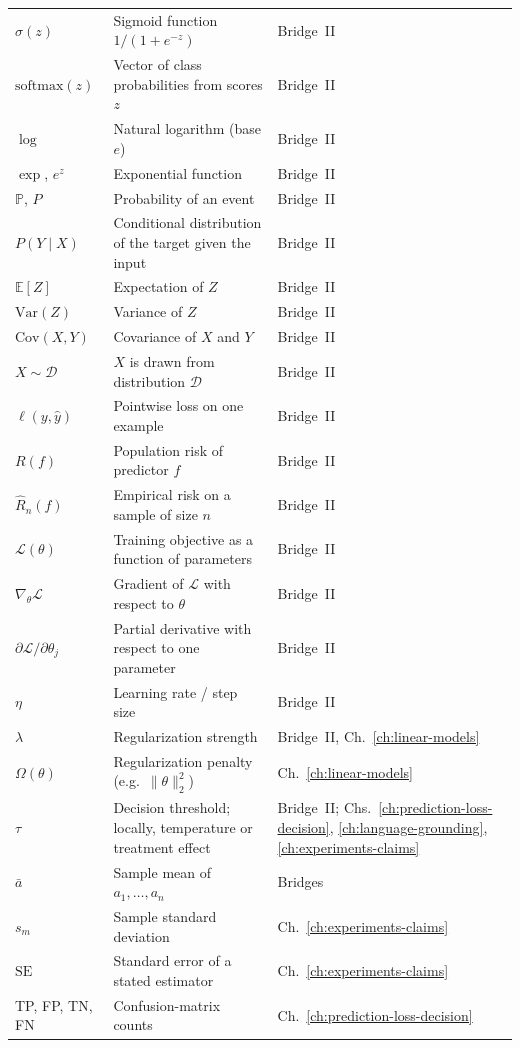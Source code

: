 \begin{longtable}{@{}L{2.0cm}L{5.55cm}L{2.6cm}@{}}
$\sigma(z)$ & Sigmoid function $1/(1+e^{-z})$ & Bridge~II \\
$\mathrm{softmax}(z)$ & Vector of class probabilities from scores $z$ & Bridge~II \\
$\log$ & Natural logarithm (base $e$) & Bridge~II \\
$\exp$, $e^z$ & Exponential function & Bridge~II \\
$\mathbb{P}$, $P$ & Probability of an event & Bridge~II \\
$P(Y \mid X)$ & Conditional distribution of the target given the input & Bridge~II \\
$\mathbb{E}[Z]$ & Expectation of $Z$ & Bridge~II \\
$\mathrm{Var}(Z)$ & Variance of $Z$ & Bridge~II \\
$\mathrm{Cov}(X,Y)$ & Covariance of $X$ and $Y$ & Bridge~II \\
$X \sim \mathcal{D}$ & $X$ is drawn from distribution $\mathcal{D}$ & Bridge~II \\
$\ell(y,\hat{y})$ & Pointwise loss on one example & Bridge~II \\
$R(f)$ & Population risk of predictor $f$ & Bridge~II \\
$\hat{R}_n(f)$ & Empirical risk on a sample of size $n$ & Bridge~II \\
$\mathcal{L}(\theta)$ & Training objective as a function of parameters & Bridge~II \\
$\nabla_\theta \mathcal{L}$ & Gradient of $\mathcal{L}$ with respect to $\theta$ & Bridge~II \\
$\partial \mathcal{L}/\partial \theta_j$ & Partial derivative with respect to one parameter & Bridge~II \\
$\eta$ & Learning rate / step size & Bridge~II \\
$\lambda$ & Regularization strength & Bridge~II, Ch.~\ref{ch:linear-models} \\
$\Omega(\theta)$ & Regularization penalty (e.g.\ $\|\theta\|_2^2$) & Ch.~\ref{ch:linear-models} \\
$\tau$ & Decision threshold; locally, temperature or treatment effect & Bridge~II; Chs.~\ref{ch:prediction-loss-decision}, \ref{ch:language-grounding}, \ref{ch:experiments-claims} \\
$\bar{a}$ & Sample mean of $a_1,\ldots,a_n$ & Bridges \\
$s_m$ & Sample standard deviation & Ch.~\ref{ch:experiments-claims} \\
$\mathrm{SE}$ & Standard error of a stated estimator & Ch.~\ref{ch:experiments-claims} \\
TP, FP, TN, FN & Confusion-matrix counts & Ch.~\ref{ch:prediction-loss-decision} \\


\end{longtable}
